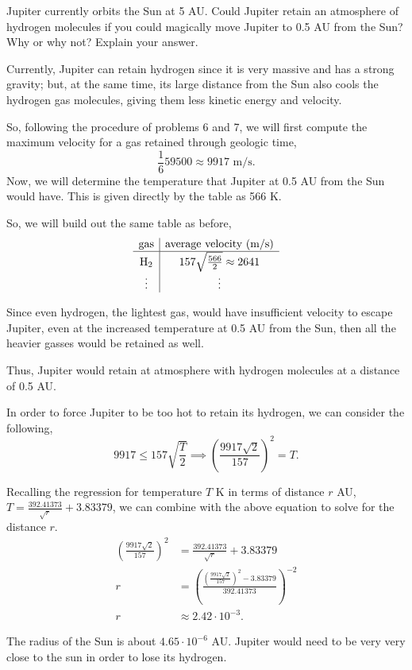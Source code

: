 \documentclass[../astro_4]{subfiles}
\begin{document}
\begin{problem}
Jupiter currently orbits the Sun at 5 AU.
Could Jupiter retain an atmosphere of hydrogen molecules if you could magically move Jupiter to 0.5 AU from the Sun?
Why or why not?
Explain your answer.
\end{problem}

Currently, Jupiter can retain hydrogen since it is very massive and has a strong gravity; but, at the same time, its large distance from the Sun also cools the hydrogen gas molecules, giving them less kinetic energy and velocity.

So, following the procedure of problems 6 and 7, we will first compute the maximum velocity for a gas retained through geologic time, \[
	\frac{1}{6}59500\approx 9917\text{ m/s}
	.\]
Now, we will determine the temperature that Jupiter at 0.5 AU from the Sun would have.
This is given directly by the table as 566 K.

So, we will build out the same table as before,
\[
	\begin{array}{c | c}
		\text{gas} & \text{average velocity (m/s)}        \\
		\hline
		\text{H}_2 & 157\sqrt{\frac{566}{2}} \approx 2641 \\
		\vdots     & \vdots                               \\
	\end{array}
\]

Since even hydrogen, the lightest gas, would have insufficient velocity to escape Jupiter, even at the increased temperature at 0.5 AU from the Sun, then all the heavier gasses would be retained as well.

Thus, Jupiter would retain at atmosphere with hydrogen molecules at a distance of 0.5 AU.

In order to force Jupiter to be too hot to retain its hydrogen, we can consider the following,
\[
	9917 \le 157\sqrt{\frac{T}{2}} \implies {\left(\frac{9917\sqrt{2}}{157}\right) }^2= T
	.\]

Recalling the regression for temperature $T$ K in terms of distance $r$ AU, $T=\frac{392.41373}{\sqrt{r}}+3.83379$, we can combine with the above equation to solve for the distance $r$.
\begin{align*}
	{\left(\frac{9917\sqrt{2}}{157}\right) }^2 & = \frac{392.41373}{\sqrt{r}}+3.83379                                                      \\
	r                                          & = {\left(\frac{{\left(\frac{9917\sqrt{2}}{157}\right)}^2-3.83379}{392.41373}\right)}^{-2} \\
	r                                          & \approx 2.42\cdot10^{-3}
	.\end{align*}

The radius of the Sun is about $4.65\cdot 10^{-6}$ AU. Jupiter would need to be very very close to the sun in order to lose its hydrogen.
\end{document}
